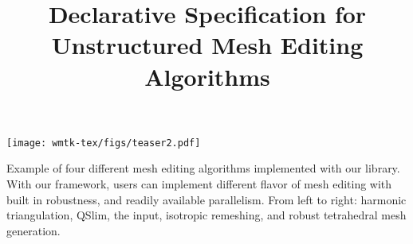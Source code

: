 \documentclass[acmtog,anonymous,review]{acmart}
\title{Declarative Specification for Unstructured Mesh Editing Algorithms}
\begin{document}
\begin{abstract}

\end{abstract}

\begin{teaserfigure}
    \centering\footnotesize
    \texttt{[image: wmtk-tex/figs/teaser2.pdf]}
    \caption{{Example of four different mesh editing algorithms implemented with our library. With our framework, users can implement different flavor of mesh editing with built in robustness, and readily available parallelism. From left to right: harmonic triangulation, QSlim, the input, isotropic remeshing, and robust tetrahedral mesh generation. }}
    \label{wmtk:fig:teaser}
\end{teaserfigure}

\maketitle









% 
\end{document}
